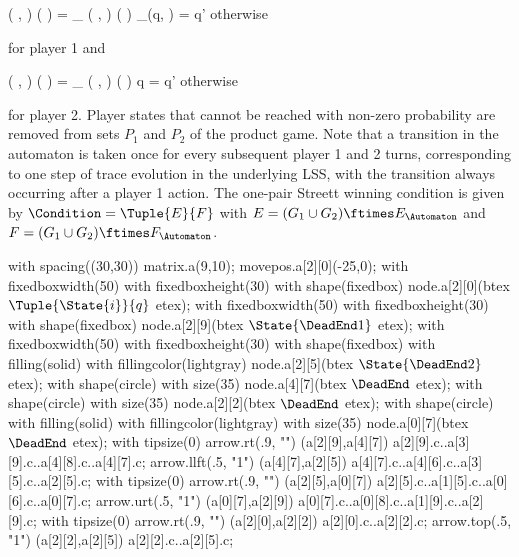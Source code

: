     \startformula
        \Transition
            \Big( ,  \Big)
            \Big(  \Big)
        = \startmathcases
            \NC \Transition_\GameGraph
            \Big( ,  \Big)
            \Big(  \Big)
            \MC \StartIf \Transition_\Automaton(q, ) = q'
            \NR
            \NC otherwise
            \NR
        \stopmathcases
    \stopformula

    for player 1 and

    \startformula
        \Transition
            \Big( ,  \Big)
            \Big(  \Big)
        = \startmathcases
            \NC \Transition_\GameGraph
            \Big( ,  \Big)
            \Big(  \Big)
            \MC \StartIf q = q'
            \NR
            \NC otherwise
            \NR
        \stopmathcases
    \stopformula

    for player 2.
    Player states that cannot be reached with non-zero probability are removed from sets $P_1$ and $P_2$ of the product game.
    Note that a transition in the automaton is taken once for every subsequent player 1 and 2 turns, corresponding to one step of trace evolution in the underlying LSS, with the transition always occurring after a player 1 action.
    The one-pair Streett winning condition is given by $\Condition = \Tuple{E}{F}$ with $E = (G_1 \cup G_2) \ftimes E_\Automaton$ and $F = (G_1 \cup G_2) \ftimes F_\Automaton$.

\stopsubsection


    with spacing((30,30)) matrix.a(9,10);
    movepos.a[2][0](-25,0);
    with fixedboxwidth(50) with fixedboxheight(30) with shape(fixedbox) node.a[2][0](btex $\Tuple{\State{i}}{q}$ etex);
    with fixedboxwidth(50) with fixedboxheight(30) with shape(fixedbox) node.a[2][9](btex $\State{\DeadEnd1}$ etex);
    with fixedboxwidth(50) with fixedboxheight(30) with shape(fixedbox) with filling(solid) with fillingcolor(lightgray) node.a[2][5](btex $\State{\DeadEnd2}$ etex);
    with shape(circle) with size(35) node.a[4][7](btex \ssd $\DeadEnd$ etex);
    with shape(circle) with size(35) node.a[2][2](btex \ssd $\DeadEnd$ etex);
    with shape(circle) with filling(solid) with fillingcolor(lightgray) with size(35) node.a[0][7](btex \ssd $\DeadEnd$ etex);
    with tipsize(0) arrow.rt(.9, "") (a[2][9],a[4][7]) a[2][9].c..a[3][9].c..a[4][8].c..a[4][7].c;
    arrow.llft(.5, "1") (a[4][7],a[2][5]) a[4][7].c..a[4][6].c..a[3][5].c..a[2][5].c;
    with tipsize(0) arrow.rt(.9, "") (a[2][5],a[0][7]) a[2][5].c..a[1][5].c..a[0][6].c..a[0][7].c;
    arrow.urt(.5, "1") (a[0][7],a[2][9]) a[0][7].c..a[0][8].c..a[1][9].c..a[2][9].c;
    with tipsize(0) arrow.rt(.9, "") (a[2][0],a[2][2]) a[2][0].c..a[2][2].c;
    arrow.top(.5, "1") (a[2][2],a[2][5]) a[2][2].c..a[2][5].c;
\stopreusableMPgraphic

